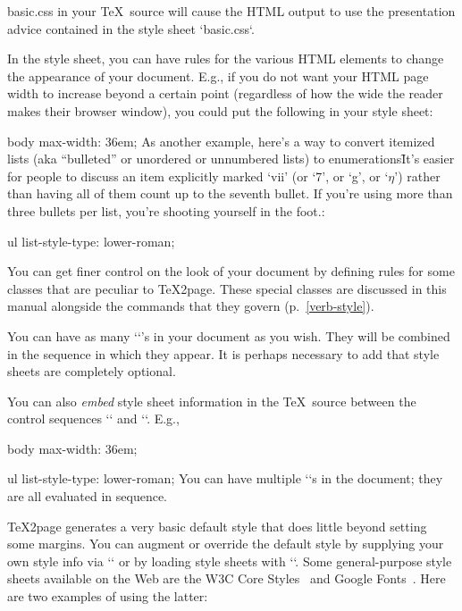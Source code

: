 \begintt
\ifx\shipout\UnDeFiNeD %
   basic.css
\fi
\endtt
%
in your \TeX\ source will cause the HTML output to
use the presentation advice contained in the
style sheet `basic.css`.

In the style sheet, you can have rules for the various
HTML elements to change the appearance of your
document.  E.g., if you do not want your HTML page
width to increase beyond a certain point (regardless of
how the wide the reader makes their browser window),
you could put the following in your style sheet:

\begintt
body {
  max-width: 36em;
}
\endtt
As another example, here’s a way to convert itemized lists (aka
“bulleted” or unordered or unnumbered lists) to
enumerations\f{It’s easier for people to discuss an item
explicitly marked ‘vii’ (or ‘7’, or ‘g’, or ‘$\eta$’) rather than
having all of them count up to the seventh bullet. If you’re using
more than three bullets per list, you’re shooting yourself in the
foot.}:

\begintt
ul {
  list-style-type: lower-roman;
}
\endtt

You can get finer control on the look of your document
by defining rules for some classes that are peculiar to
\TeX2page.  These special classes
are discussed in this manual alongside the commands
that they govern (p.~\ref{verb-style}).

You can have as many ``’s in your
document as you wish.  They will be combined in
the sequence in which they appear.  It is perhaps
necessary to add that style sheets are completely
optional.


You can also {\em embed} style sheet information
in the \TeX\ source between the control sequences
`\cssblock` and `\endcssblock`.  E.g.,

\begintt
\ifx\shipout\UnDeFiNeD %
\cssblock
body {
  max-width: 36em;
}

ul {
  list-style-type: lower-roman;
}
\endcssblock
\fi
\endtt
%
You can
have multiple `\cssblock`s in the document; they
are all evaluated in sequence.

\TeX2page generates a very basic default style
that
does little beyond setting some margins.  You
can augment or override the default style by supplying your
own style info via `\cssblock` or by loading
style sheets with ``.   Some general-purpose
style sheets available on the Web are the W3C Core
Styles~\cite{w3ccorestyles} and Google Fonts~\cite{googlefonts}.
Here are two examples of using the latter:

